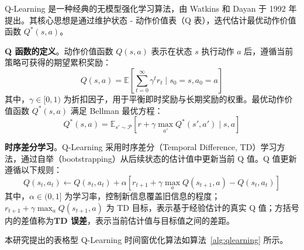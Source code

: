 \label{sec:qlearning}

\label{subsec:algorithm}

Q-Learning 是一种经典的无模型强化学习算法，由 Watkins 和 Dayan 于 1992 年提出\cite{watkins1992q}。其核心思想是通过维护状态 - 动作价值表（Q 表），迭代估计最优动作价值函数 $Q^*(s, a)$。

\textbf{Q 函数的定义}。动作价值函数 $Q(s, a)$ 表示在状态 $s$ 执行动作 $a$ 后，遵循当前策略可获得的期望累积奖励：
\begin{equation}
Q(s, a) = \mathbb{E} \left[ \sum_{t=0}^{\infty} \gamma^t r_t \mid s_0 = s, a_0 = a \right]
\end{equation}
其中，$\gamma \in [0, 1)$ 为折扣因子，用于平衡即时奖励与长期奖励的权重。最优动作价值函数 $Q^*(s, a)$ 满足 Bellman 最优方程：
\begin{equation}
Q^*(s, a) = \mathbb{E}_{s' \sim \mathcal{P}} \left[ r + \gamma \max_{a'} Q^*(s', a') \mid s, a \right]
\end{equation}

\textbf{时序差分学习}。Q-Learning 采用时序差分（Temporal Difference, TD）学习方法，通过自举（bootstrapping）从后续状态的估计值中更新当前 Q 值。Q 值更新遵循以下规则：
\begin{equation}
Q(s_t, a_t) \leftarrow Q(s_t, a_t) + \alpha \left[ r_{t+1} + \gamma \max_{a} Q(s_{t+1}, a) - Q(s_t, a_t) \right]
\end{equation}
其中，$\alpha \in (0, 1]$ 为学习率，控制新信息覆盖旧信息的程度；$r_{t+1} + \gamma \max_{a} Q(s_{t+1}, a)$ 为 TD 目标，表示基于经验估计的真实 Q 值；方括号内的差值称为\textbf{TD 误差}，表示当前估计值与目标值之间的差距。

\label{subsec:design}

本研究提出的表格型 Q-Learning 时间窗优化算法如算法~\ref{alg:qlearning} 所示。

